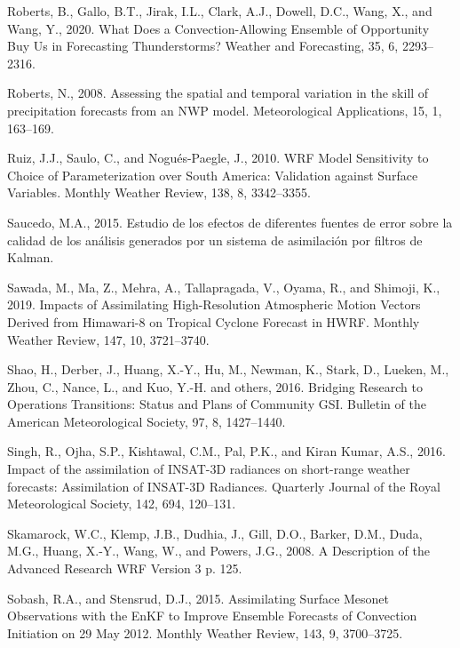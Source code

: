 \documentclass[12pt,oneside]{reedthesis}
\begin{document}
\leavevmode\hypertarget{ref-roberts2020}{}%
Roberts, B., Gallo, B.T., Jirak, I.L., Clark, A.J., Dowell, D.C., Wang, X., and Wang, Y., 2020. What Does a Convection-Allowing Ensemble of Opportunity Buy Us in Forecasting Thunderstorms? Weather and Forecasting, 35, 6, 2293--2316.

\leavevmode\hypertarget{ref-roberts2008}{}%
Roberts, N., 2008. Assessing the spatial and temporal variation in the skill of precipitation forecasts from an NWP model. Meteorological Applications, 15, 1, 163--169.

\leavevmode\hypertarget{ref-ruiz2010}{}%
Ruiz, J.J., Saulo, C., and Nogués-Paegle, J., 2010. WRF Model Sensitivity to Choice of Parameterization over South America: Validation against Surface Variables. Monthly Weather Review, 138, 8, 3342--3355.

\leavevmode\hypertarget{ref-saucedo2015}{}%
Saucedo, M.A., 2015. Estudio de los efectos de diferentes fuentes de error sobre la calidad de los análisis generados por un sistema de asimilación por filtros de Kalman.

\leavevmode\hypertarget{ref-sawada2019}{}%
Sawada, M., Ma, Z., Mehra, A., Tallapragada, V., Oyama, R., and Shimoji, K., 2019. Impacts of Assimilating High-Resolution Atmospheric Motion Vectors Derived from Himawari-8 on Tropical Cyclone Forecast in HWRF. Monthly Weather Review, 147, 10, 3721--3740.

\leavevmode\hypertarget{ref-shao2016}{}%
Shao, H., Derber, J., Huang, X.-Y., Hu, M., Newman, K., Stark, D., Lueken, M., Zhou, C., Nance, L., and Kuo, Y.-H. and others, 2016. Bridging Research to Operations Transitions: Status and Plans of Community GSI. Bulletin of the American Meteorological Society, 97, 8, 1427--1440.

\leavevmode\hypertarget{ref-singh2016}{}%
Singh, R., Ojha, S.P., Kishtawal, C.M., Pal, P.K., and Kiran Kumar, A.S., 2016. Impact of the assimilation of INSAT-3D radiances on short-range weather forecasts: Assimilation of INSAT-3D Radiances. Quarterly Journal of the Royal Meteorological Society, 142, 694, 120--131.

\leavevmode\hypertarget{ref-skamarock2008}{}%
Skamarock, W.C., Klemp, J.B., Dudhia, J., Gill, D.O., Barker, D.M., Duda, M.G., Huang, X.-Y., Wang, W., and Powers, J.G., 2008. A Description of the Advanced Research WRF Version 3 p. 125.

\leavevmode\hypertarget{ref-sobash2015}{}%
Sobash, R.A., and Stensrud, D.J., 2015. Assimilating Surface Mesonet Observations with the EnKF to Improve Ensemble Forecasts of Convection Initiation on 29 May 2012. Monthly Weather Review, 143, 9, 3700--3725.
\end{document}
